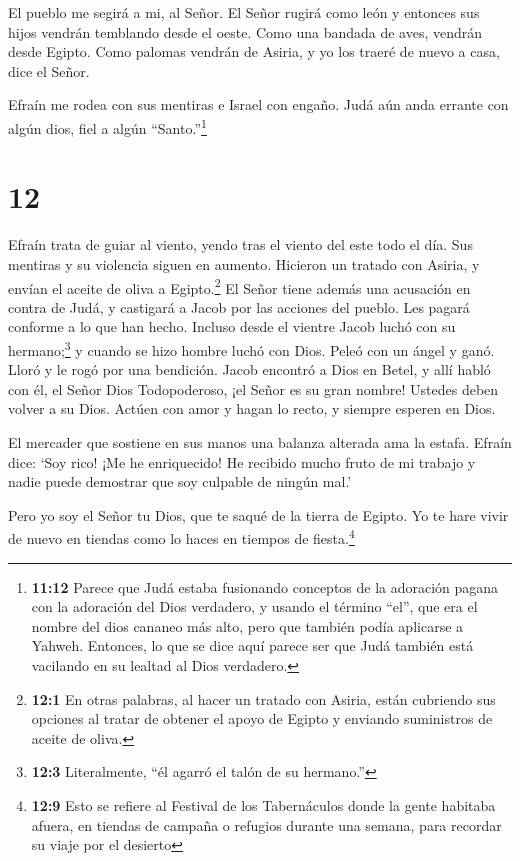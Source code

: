  El pueblo me segirá a mi, al Señor. El Señor rugirá como
león y entonces sus hijos vendrán temblando desde el oeste.
 Como una bandada de aves, vendrán desde Egipto. Como
palomas vendrán de Asiria, y yo los traeré de nuevo a casa, dice el
Señor.

 Efraín me rodea con sus mentiras e Israel con engaño. Judá
aún anda errante con algún dios, fiel a algún ``Santo.''\footnote{\textbf{11:12}
  Parece que Judá estaba fusionando conceptos de la adoración pagana con
  la adoración del Dios verdadero, y usando el término ``el'', que era
  el nombre del dios cananeo más alto, pero que también podía aplicarse
  a Yahweh. Entonces, lo que se dice aquí parece ser que Judá también
  está vacilando en su lealtad al Dios verdadero.}

\hypertarget{section-11}{%
\section{12}\label{section-11}}

 Efraín trata de guiar al viento, yendo tras el viento del
este todo el día. Sus mentiras y su violencia siguen en aumento.
Hicieron un tratado con Asiria, y envían el aceite de oliva a
Egipto.\footnote{\textbf{12:1} En otras palabras, al hacer un tratado
  con Asiria, están cubriendo sus opciones al tratar de obtener el apoyo
  de Egipto y enviando suministros de aceite de oliva.}  El
Señor tiene además una acusación en contra de Judá, y castigará a Jacob
por las acciones del pueblo. Les pagará conforme a lo que han hecho.
 Incluso desde el vientre Jacob luchó con su
hermano;\footnote{\textbf{12:3} Literalmente, ``él agarró el talón de su
  hermano.''} y cuando se hizo hombre luchó con Dios.  Peleó
con un ángel y ganó. Lloró y le rogó por una bendición. Jacob encontró a
Dios en Betel, y allí habló con él,  el Señor Dios
Todopoderoso, ¡el Señor es su gran nombre!  Ustedes deben
volver a su Dios. Actúen con amor y hagan lo recto, y siempre esperen en
Dios.

 El mercader que sostiene en sus manos una balanza alterada
ama la estafa.  Efraín dice: `Soy rico! ¡Me he enriquecido!
He recibido mucho fruto de mi trabajo y nadie puede demostrar que soy
culpable de ningún mal.'

 Pero yo soy el Señor tu Dios, que te saqué de la tierra de
Egipto. Yo te hare vivir de nuevo en tiendas como lo haces en tiempos de
fiesta.\footnote{\textbf{12:9} Esto se refiere al Festival de los
  Tabernáculos donde la gente habitaba afuera, en tiendas de campaña o
  refugios durante una semana, para recordar su viaje por el desierto}


